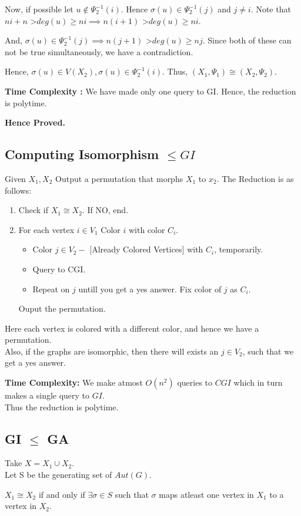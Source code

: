 Now, if possible let $u \notin \Psi_2^{-1}(i)$. Hence $\sigma(u) \in \Psi_2^{-1}(j)$ and $j \neq i$. Note that $ni + n$ \textgreater $deg(u) \ge ni \implies n(i+1)$ \textgreater $deg(u) \ge ni$.

And, $\sigma(u) \in \Psi_2^{-1}(j) \implies n(j+1)$ \textgreater $deg(u) \ge nj$. Since both of these can not be true simultaneously, we have a contradiction.

Hence, $\sigma(u) \in V(X_2) , \sigma(u) \in \Psi_2^{-1}(i)$. Thus, $(X_1,\Psi_1) \cong (X_2,\Psi_2)$.

\textbf{Time Complexity :} We have made only one query to GI. Hence, the reduction is polytime.

\textbf{Hence Proved.}

\subsection{Computing Isomorphism $\le GI$}
Given $X_1,X_2$ Output a permutation that morphs $X_1$ to $x_2$.
The Reduction is as follows:
\begin{enumerate}
\item Check if $X_1 \cong X_2$. If NO, end.
\item For each vertex $i \in V_1$ 
	Color $i$ with color $C_i$.
	\begin{itemize}
	\item Color $j \in V_2 -$ [Already Colored Vertices] with $C_i$, temporarily.
	\item Query to CGI.
	\item Repeat on $j$ untill you get a yes answer. Fix color of $j$ as $C_i$.
	\end{itemize}
Ouput the permutation.
\end{enumerate}
Here each vertex is colored with a different color, and hence we have a permutation.\\
Also, if the graphs are isomorphic, then there will exists an $j \in V_2$, such that we get a yes answer.

\textbf{Time Complexity:} We make atmost $O(n^2)$ queries to $CGI$ which in turn makes a single query to $GI$.\\Thus the reduction is polytime.




\subsection{GI $\le$ GA}
Take $X = X_1 \cup X_2$.\\
Let S be the generating set of $Aut(G)$.
\begin{claim}
$X_1 \cong X_2$ if and only if $\exists \sigma \in S$ such that $\sigma$ maps atleast one vertex in $X_1$ to a vertex in $X_2$.
\end{claim}

